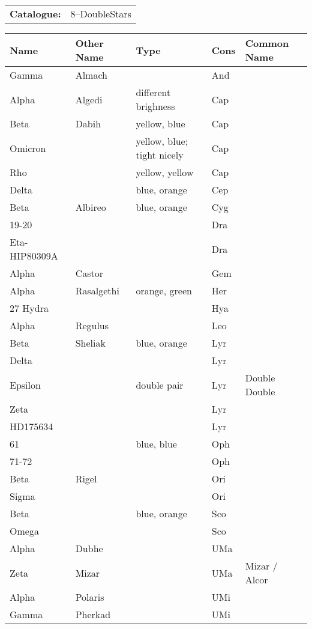 \begin{tabular}{ p{0.9in} p{1.3in}}
{\bf Catalogue:} & 8--DoubleStars \\ 
\end{tabular}
\begin{longtable}{ p{0.7in}  p{1.0in}  p{0.6in}  p{0.9in}  p{5.1in} }
\hline 
{\bf Name} & {\bf Other Name} & {\bf Type} & {\bf Cons} & {\bf Common Name} \\ 
\hline 
Gamma & Almach &  & And &  \\ 
Alpha & Algedi & different brighness & Cap &  \\ 
Beta & Dabih & yellow, blue & Cap &  \\ 
Omicron &  & yellow, blue; tight nicely & Cap &  \\ 
Rho &  & yellow, yellow & Cap &  \\ 
Delta &  & blue, orange & Cep &  \\ 
Beta & Albireo & blue, orange & Cyg &  \\ 
19-20 &  &  & Dra &  \\ 
Eta-HIP80309A &  &  & Dra &  \\ 
Alpha & Castor &  & Gem &  \\ 
Alpha & Rasalgethi & orange, green & Her &  \\ 
27 Hydra &  &  & Hya &  \\ 
Alpha & Regulus &  & Leo &  \\ 
Beta & Sheliak & blue, orange & Lyr &  \\ 
Delta &  &  & Lyr &  \\ 
Epsilon &  & double pair & Lyr & Double Double \\ 
Zeta &  &  & Lyr &  \\ 
HD175634 &  &  & Lyr &  \\ 
61 &  & blue, blue & Oph &  \\ 
71-72 &  &  & Oph &  \\ 
Beta & Rigel &  & Ori &  \\ 
Sigma &  &  & Ori &  \\ 
Beta &  & blue, orange & Sco &  \\ 
Omega &  &  & Sco &  \\ 
Alpha & Dubhe &  & UMa &  \\ 
Zeta & Mizar &  & UMa & Mizar / Alcor \\ 
Alpha & Polaris &  & UMi &  \\ 
Gamma & Pherkad &  & UMi &  \\ 
\hline 
\end{longtable} 
